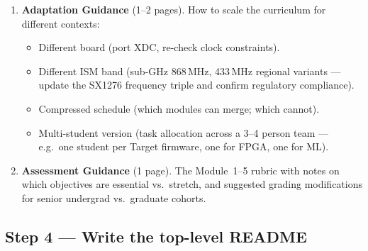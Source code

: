 \documentclass[11pt,letterpaper]{article}
\begin{document}
\begin{enumerate}[leftmargin=2em]
\begin{itemize}[leftmargin=1.2em]
		\item \textbf{Symptom:} ``Both Targets print \texttt{I'm Jammed} but the wrong one does so first.'' Diagnosis: RSSI tie at the Threat. Fix: this is the F5/F6 failure mode in LH5-E; document and continue, do not patch the firmware to add hysteresis without also re-running LH5-A.
	\end{itemize}
	\item \textbf{Adaptation Guidance} (1--2 pages). How to scale the curriculum for different contexts:
	\begin{itemize}[leftmargin=1.2em]
		\item Different \FPGA{} board (port \mbox{XDC}, re-check clock constraints).
		\item Different \mbox{ISM} band (sub-GHz 868\,MHz, 433\,MHz regional variants --- update the SX1276 frequency triple and confirm regulatory compliance).
		\item Compressed schedule (which modules can merge; which cannot).
		\item Multi-student version (task allocation across a 3--4 person team --- e.g.\ one student per Target firmware, one for FPGA, one for ML).
	\end{itemize}
	\item \textbf{Assessment Guidance} (1 page). The Module~1--5 rubric with notes on which objectives are essential vs.\ stretch, and suggested grading modifications for senior undergrad vs.\ graduate cohorts.
\end{enumerate}

\subsection{Step 4 --- Write the top-level README}
\end{document}
